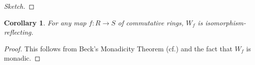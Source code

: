 \documentclass{amsart}
\newtheorem{corollary}[equation]{Corollary}
\theoremstyle{definition}
\DeclareMathOperator{\Tbb}{\mathbb{T}}
\DeclareMathOperator{\res}{res}
\newcommand{\CAlg}[1]{\mathbf{CAlg}_{#1}}
\let\epsilon\varepsilon
\let\epsilon\varepsilon
\numberwithin{equation}{subsection}
\begin{document}
\begin{proof}[Sketch]
\end{proof}
\begin{corollary}\label{Cor: Section Background Alg: Weil restriction is monadic}
	For any map $f:R \to S$ of commutative rings, $W_{f}$ is isomorphism-reflecting.
\end{corollary}
\begin{proof}
	This follows from Beck's Monadicity Theorem (cf.\@  \cite[Theorem 4.4.4]{BorceuxHandBook2}) and the fact that $W_{f}$ is monadic.%
\end{proof}
\end{document}
